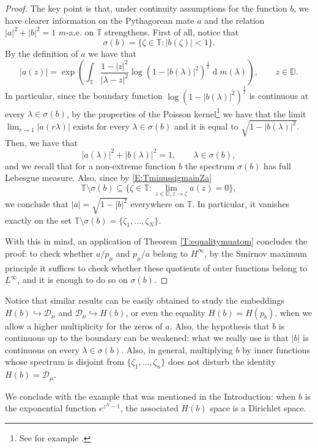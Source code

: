 \documentclass[12pt]{amsart}
\theoremstyle{definition}
\theoremstyle{remark}
\theoremstyle{remark}
\begin{document}
\begin{proof}
The key point is that, under continuity assumptions for the function $b$, we have clearer information on the Pythagorean mate $a$ and the relation $|a|^2+|b|^2=1$ $m$-a.e. on $\mathbb{T}$ strengthens. First of all, notice that
\[\sigma(b)=\{\zeta\in\mathbb{T}\colon |b(\zeta)|<1\}.\]
By the definition of $a$ we have that
\[|a(z)|=\exp{\left(\int_\mathbb{T} \frac{1-|z|^2}{|\lambda-z|^2}\log(1-|b(\lambda)|^2)^\frac{1}{2}\operatorname{d}\!m(\lambda)\right)},\qquad z\in\mathbb{D}.\]
In particular, since the boundary function $\log(1-|b(\lambda)|^2)^\frac{1}{2}$ is continuous at every $\lambda\in\sigma(b)$, by the properties of the Poisson kernel\footnote{See for example \cite[Theorem 1.2]{Duren}.} we have that the limit $\lim_{r\to 1}|a(r\lambda)|$ exists for every $\lambda\in\sigma(b)$ and it is equal to $\sqrt{1-|b(\lambda)|^2}$. Then, we have that 
\[|a(\lambda)|^2+|b(\lambda)|^2=1,\qquad\lambda\in\sigma(b),\]
and we recall that for a non-extreme function $b$ the spectrum $\sigma(b)$ has full Lebesgue measure. Also, since by \eqref{E:TminussigmainZa} 
 \begin{equation*} 
    \mathbb{T}\setminus \sigma(b) \subseteq \{\zeta\in\mathbb{T}\colon \lim_{z\in\mathbb{D},z\to\zeta}a(z)=0\},
\end{equation*}
we conclude that $|a|=\sqrt{1-|b|^2}$ everywhere on $\mathbb{T}$. In particular, it vanishes exactly on the set $\mathbb{T}\setminus\sigma(b)=\{\zeta_1,\ldots,\zeta_N\}.$

With this in mind, an application of Theorem \ref{T:equalitymuatom} concludes the proof: to check whether $a/p_\mu$ and $p_\mu/a$ belong to $H^\infty$, by the Smirnov maximum principle it suffices to check whether these quotients of outer functions belong to $L^\infty$, and it is enough to do so on $\sigma(b)$. 
\end{proof}

Notice that similar results can be easily obtained to study the embeddings $H(b)\hookrightarrow\mathcal{D}_\mu$ and $\mathcal{D}_\mu\hookrightarrow H(b)$, or even the equality $H(b)=H(p_b)$, when we allow a higher multiplicity for the zeros of $a$. Also, the hypothesis that $b$ is continuous up to the boundary can be weakened: what we really use is that $|b|$ is continuous on every $\lambda\in\sigma(b)$. Also, in general, multiplying $b$ by inner functions whose spectrum is disjoint from $\{\zeta_1,\ldots,\zeta_n\}$ does not disturb the identity $H(b)=\mathcal{D}_\mu$. 

We conclude with the example that was mentioned in the Introduction: when $b$ is the exponential function $e^{z^{N}-1}$, the associated $H(b)$ space is a Dirichlet space.
\end{document}
